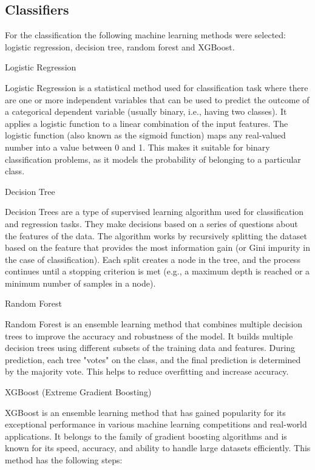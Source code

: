 \subsection{Classifiers}

For the classification the following machine learning methods were
selected: logistic regression, decision tree, random forest and XGBoost.

Logistic Regression

Logistic Regression is a statistical method used for classification task
where there are one or more independent variables that can be used to
predict the outcome of a categorical dependent variable (usually binary,
i.e., having two classes). It applies a logistic function to a linear
combination of the input features. The logistic function (also known as
the sigmoid function) maps any real-valued number into a value between 0
and 1. This makes it suitable for binary classification problems, as it
models the probability of belonging to a particular class.

Decision Tree

Decision Trees are a type of supervised learning algorithm used for
classification and regression tasks. They make decisions based on a
series of questions about the features of the data. The algorithm works
by recursively splitting the dataset based on the feature that provides
the most information gain (or Gini impurity in the case of
classification). Each split creates a node in the tree, and the process
continues until a stopping criterion is met (e.g., a maximum depth is
reached or a minimum number of samples in a node).

Random Forest

Random Forest is an ensemble learning method that combines multiple
decision trees to improve the accuracy and robustness of the model. It
builds multiple decision trees using different subsets of the training
data and features. During prediction, each tree "votes" on the class,
and the final prediction is determined by the majority vote. This helps
to reduce overfitting and increase accuracy.

XGBoost (Extreme Gradient Boosting)

XGBoost is an ensemble learning method that has gained popularity for
its exceptional performance in various machine learning competitions and
real-world applications. It belongs to the family of gradient boosting
algorithms and is known for its speed, accuracy, and ability to handle
large datasets efficiently. This method has the following steps:

